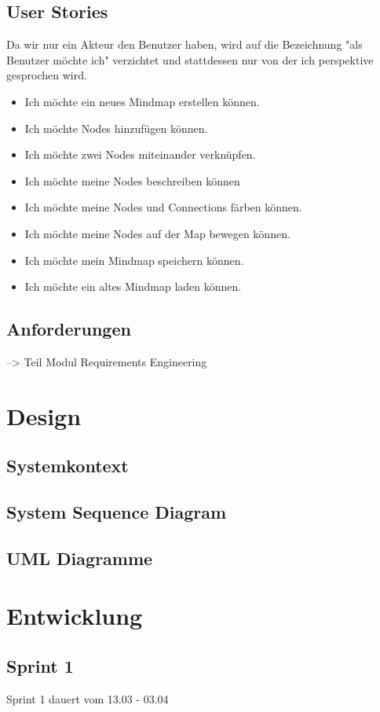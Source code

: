 \documentclass[a4paper,parskip]{scrartcl}
\begin{document}
\subsection{User Stories}
Da wir nur ein Akteur den Benutzer haben, wird auf die Bezeichnung "als Benutzer möchte ich" verzichtet und stattdessen nur von der ich perspektive gesprochen wird. 
\begin{itemize}
\item Ich möchte ein neues Mindmap erstellen können.
\item Ich möchte Nodes hinzufügen können. 
\item Ich möchte zwei Nodes miteinander verknüpfen.
\item Ich möchte meine Nodes beschreiben können
\item Ich möchte meine Nodes und Connections färben können.
\item Ich möchte meine Nodes auf der Map bewegen können. 
\item Ich möchte mein Mindmap speichern können.
\item Ich möchte ein altes Mindmap laden können.
\end{itemize}

\subsection{Anforderungen}
--> Teil Modul Requirements Engineering

\section{Design}

\subsection{Systemkontext}


\subsection{System Sequence Diagram}

\subsection{UML Diagramme}

\section{Entwicklung}
\subsection{Sprint 1}
Sprint 1 dauert vom 13.03 - 03.04
\end{document}
